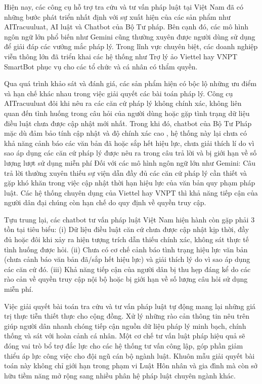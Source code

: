 \documentclass[../DoAn.tex]{subfiles}
\begin{document}
Hiện nay, các công cụ hỗ trợ tra cứu và tư vấn pháp luật tại Việt Nam đã có những bước phát triển nhất định với sự xuất hiện của các sản phẩm như AITracuuluat, AI luật và Chatbot của Bộ Tư pháp. Bên cạnh đó, các mô hình ngôn ngữ lớn phổ biến như Gemini cũng thường xuyên được người dùng sử dụng để giải đáp các vướng mắc pháp lý. Trong lĩnh vực chuyên biệt, các doanh nghiệp viễn thông lớn đã triển khai các hệ thống như Trợ lý ảo Viettel hay VNPT SmartBot phục vụ cho các tổ chức và cá nhân có thẩm quyền.

Qua quá trình khảo sát và đánh giá, các sản phẩm hiện có bộc lộ những ưu điểm và hạn chế khác nhau trong việc giải quyết các bài toán pháp lý. Công cụ AITracuuluat đôi khi nêu ra các căn cứ pháp lý không chính xác, không liên quan đến tình huống trong câu hỏi của người dùng hoặc gặp tình trạng dữ liệu điều luật chưa được cập nhật mới nhất. Trong khi đó, chatbot của Bộ Tư Pháp mặc dù đảm bảo tính cập nhật và độ chính xác cao , hệ thống này lại chưa có khả năng cảnh báo các văn bản đã hoặc sắp hết hiệu lực, chưa giải thích lí do vì sao áp dụng các căn cứ pháp lý được nêu ra trong câu trả lời và bị giới hạn về số lượng lượt sử dụng miễn phí Đối với các mô hình ngôn ngữ lớn như Gemini: Câu trả lời thường xuyên thiếu sự viện dẫn đầy đủ các căn cứ pháp lý cần thiết và gặp khó khăn trong việc cập nhật thời hạn hiệu lực của văn bản quy phạm pháp luật. Các hệ thống chuyên dụng của Viettel hay VNPT thì khả năng tiếp cận của người dân đại chúng còn hạn chế do quy định về quyền truy cập.

Tựu trung lại, các chatbot tư vấn pháp luật Việt Nam hiện hành còn gặp phải 3 tồn tại tiêu biểu: (i) Dữ liệu điều luật căn cứ chưa được cập nhật kịp thời, đầy đủ hoặc đôi khi xảy ra hiện tượng trích dẫn thiếu chính xác, không sát thực tế tình huống được hỏi. (ii) Chưa có cơ chế cảnh báo tình trạng hiệu lực văn bản (chưa cảnh báo văn bản đã/sắp hết hiệu lực) và giải thích lý do vì sao áp dụng các căn cứ đó. (iii) Khả năng tiếp cận của người dân bị thu hẹp đáng kể do các rào cản về quyền truy cập nội bộ hoặc bị giới hạn về số lượng câu hỏi sử dụng miễn phí.

Việc giải quyết bài toán tra cứu và tư vấn pháp luật tự động mang lại những giá trị thực tiễn thiết thực cho cộng đồng. Xử lý những rào cản thông tin nêu trên giúp người dân nhanh chóng tiếp cận nguồn dữ liệu pháp lý minh bạch, chính thống và sát với hoàn cảnh cá nhân. Một cơ chế tư vấn luật pháp hiệu quả sẽ đóng vai trò bổ trợ đắc lực cho các hệ thống tư vấn công lập, góp phần giảm thiểu áp lực công việc cho đội ngũ cán bộ ngành luật. Khuôn mẫu giải quyết bài toán này không chỉ giới hạn trong phạm vi Luật Hôn nhân và gia đình mà còn sở hữu tiềm năng mở rộng sang nhiều phân hệ pháp luật chuyên ngành khác.
\end{document}
